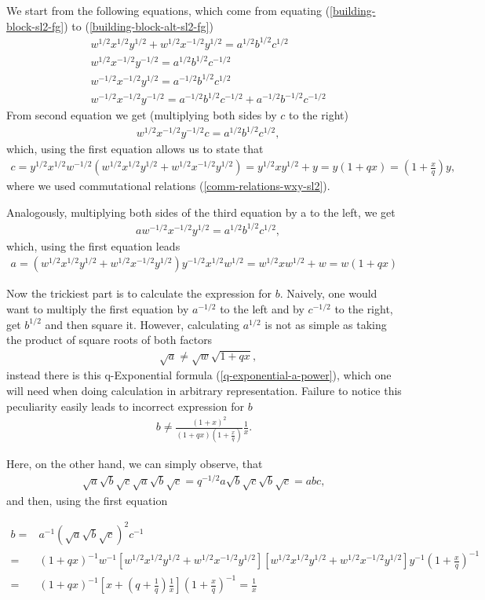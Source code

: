 \documentclass{article}
\newcommand{\lb}{\left (}
\newcommand{\rb}{\right )}
\newcommand{\lsb}{\left [}
\newcommand{\rsb}{\right ]}
\newcommand{\be}{\begin{eqnarray}}
\newcommand{\ee}{\end{eqnarray}}
\newcommand {\?}{\textit{???}}
\newcommand{\delabel}[1]{(\ref{#1})}
\begin{document}
We start from the following equations, which come from equating \delabel{building-block-sl2-fg} to \delabel{building-block-alt-sl2-fg}
\be
& w^{1/2}x^{1/2} y^{1/2} + w^{1/2}x^{-1/2}y^{1/2} = a^{1/2}b^{1/2}c^{1/2} \\
& w^{1/2}x^{-1/2}y^{-1/2} = a^{1/2}b^{1/2}c^{-1/2} \\
& w^{-1/2}x^{-1/2}y^{1/2} = a^{-1/2}b^{1/2}c^{1/2} \\
& w^{-1/2}x^{-1/2}y^{-1/2} = a^{-1/2}b^{1/2}c^{-1/2} + a^{-1/2}b^{-1/2}c^{-1/2}
\ee
From second equation we get (multiplying both sides by $c$ to the right)
\be
& w^{1/2}x^{-1/2}y^{-1/2} c = a^{1/2}b^{1/2}c^{1/2},
\ee
which, using the first equation allows us to state that
\be
c = y^{1/2}x^{1/2}w^{-1/2}\lb w^{1/2}x^{1/2}y^{1/2} + w^{1/2}x^{-1/2}y^{1/2} \rb
= y^{1/2} x y^{1/2} + y = y\lb 1 + qx\rb = \lb 1 + \frac{x}{q} \rb y,
\ee
where we used commutational relations \delabel{comm-relations-wxy-sl2}.

Analogously, multiplying both sides of the third equation by a to the left, we get
\be
& a w^{-1/2} x^{-1/2} y^{1/2} = a^{1/2}b^{1/2}c^{1/2},
\ee
which, using the first equation leads
\be
a = \lb w^{1/2}x^{1/2}y^{1/2} + w^{1/2}x^{-1/2}y^{1/2} \rb y^{-1/2}x^{1/2}w^{1/2}
= w^{1/2}x w^{1/2} + w = w \lb 1 + q x \rb
\ee

Now the trickiest part is to calculate the expression for $b$. Naively, one  would want
to multiply the first equation by $a^{-1/2}$ to the left and by $c^{-1/2}$ to the right,
get $b^{1/2}$ and then square it.
However, calculating $a^{1/2}$ is not as simple as taking the product of square roots of both factors
\be
&\sqrt{a} \neq \sqrt{w} \sqrt{1 + q x},
\ee
instead there is this q-Exponential formula \delabel{q-exponential-a-power}, which one will need when
doing calculation in arbitrary representation.
Failure to notice this peculiarity easily leads to incorrect expression for $b$
\be
b \neq \frac{\lb 1 + x\rb^2}{\lb 1 + q x\rb\lb 1 + \frac{x}{q}\rb} \frac{1}{x}.
\ee

Here, on the other hand, we can simply observe, that
\be
\sqrt{a} \sqrt{b} \sqrt{c} \sqrt{a} \sqrt{b} \sqrt{c} = q^{-1/2} a \sqrt{b} \sqrt{c} \sqrt{b} \sqrt{c} = abc,
\ee
and then, using the first equation

\be
b = & a^{-1} \lb \sqrt{a}\sqrt{b}\sqrt{c} \rb^2 c^{-1} & \nonumber \\
= & \lb 1 + qx\rb^{-1}w^{-1}\lsb w^{1/2}x^{1/2}y^{1/2} + w^{1/2}x^{-1/2}y^{1/2} \rsb
\lsb w^{1/2}x^{1/2}y^{1/2} + w^{1/2}x^{-1/2}y^{1/2} \rsb y^{-1}\lb 1 + \frac{x}{q}\rb^{-1}
\\ = & \lb 1 + qx\rb^{-1} \lsb x + \lb q + \frac{1}{q} \rb \frac{1}{x} \rsb \lb 1 + \frac{x}{q}\rb^{-1} = \frac{1}{x}
\nonumber 
\ee
\end{document}
